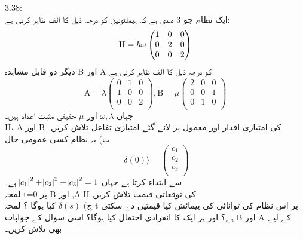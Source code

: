  3.38:\\
ایک نظام جو 3 صدی ہے کہ ہيملٹونین کو درجہ ذیل کا الف ظاہر کرتی ہے:\\
\[\text{\text{H}}=\hslash\omega\begin{pmatrix}
1&0&0\\
0&2&0\\
0&0&2\\
\end{pmatrix}\]
دیگر دو قابل مشاہدہ B اور A کو درجہ ذيل کا الف ظاہر کرتی ہے\\
\[\text{A}=\lambda\begin{pmatrix}
0&1&0\\
1&0&0\\
0&0&2\\
\end{pmatrix} , \text{B}=\mu\begin{pmatrix}
2&0&0\\
0&0&1\\
0&1&0\\
\end{pmatrix}
\]
جہاں
\(\omega, \lambda\)
اور
\(\mu\)
حقیقی مثبت اعداد ہیں۔\\
H، A
اور
B
 کی امتیازی اقدار اور معمول پر لائے  گئے امتیازی تفاعل تلاش کریں۔ \\
ب) یہ نظام کسی عمومی حال
\[| \delta(0)  \rangle=\begin{pmatrix}
c_{1}\\
c_{2}\\
c_{3}\\
\end{pmatrix}\]
سے ابتداء کرتا ہے جہاں
\(\abs{c_{1}}^{2}+\abs{c_{2}}^{2}+\abs{c_{3}}^{2}=1\)
ہے۔\\
لمحہ t=0 پر B اور ,A Hکی توقعاتی قیمت تلاش كريں۔\\
ج)
 \(\delta(s)\) 
کیا ہوگا ؟
لمحہ t پر اس نظام کی توانائی کی پیمائش کیا قيمتيں دے سکتی ہے؟ اور ہر ایک کا انفرادى احتمال کیا ہوگا؟ اسی سوال کے جوابات B اور A کے لیے بھی تلاش كریں۔

